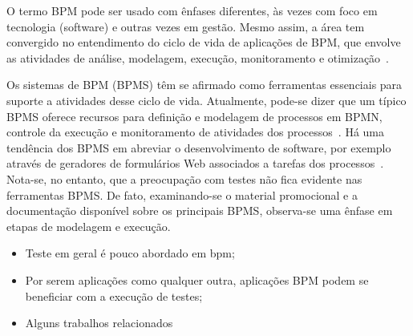 \documentclass[12pt]{article}
\begin{document}
O termo BPM pode ser usado com ênfases diferentes, às vezes com foco em tecnologia (software) e outras vezes em gestão. Mesmo assim, a área tem convergido no entendimento do ciclo de vida de aplicações de BPM, que envolve as atividades de análise, modelagem, execução, monitoramento e otimização~\cite{ABPMP}. 

Os sistemas de BPM (BPMS) têm se afirmado como ferramentas essenciais para suporte a atividades desse ciclo de vida. Atualmente, pode-se dizer que um típico BPMS oferece recursos para definição e modelagem de processos em BPMN, controle da execução e monitoramento de atividades dos processos~\cite{forrester}. Há uma tendência dos BPMS em abreviar o desenvolvimento de software, por exemplo através de geradores de formulários Web associados a tarefas dos processos~\cite{greenresearch}. Nota-se, no entanto, que a preocupação com testes não fica evidente nas ferramentas BPMS. De fato, examinando-se o material promocional e a documentação disponível sobre os principais BPMS, observa-se uma ênfase em etapas de modelagem e execução.

\begin{itemize}
\item Teste em geral é pouco abordado em bpm;
\item Por serem aplicações como qualquer outra, aplicações BPM podem se beneficiar com a execução de testes;
\item Alguns trabalhos relacionados
\end{itemize}


\end{document}
